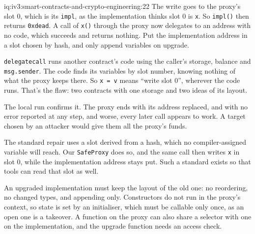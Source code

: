 \begin{solution}{iq:iv3:smart-contracts-and-crypto-engineering:22}
The write goes to the proxy's slot 0, which is its \texttt{impl}, as the implementation thinks slot 0 is \texttt{x}. So \texttt{impl()} then returns \texttt{0xdead}. A call of \texttt{x()} through the proxy now delegates to an address with no code, which succeeds and returns nothing. Put the implementation address in a slot chosen by hash, and only append variables on upgrade.

\texttt{delegatecall} runs another contract's code using the caller's storage, balance and \texttt{msg.sender}. The code finds its variables by slot number, knowing nothing of what the proxy keeps there. So \texttt{x = v} means ``write slot 0'', wherever the code runs. That's the flaw: two contracts with one storage and two ideas of its layout.

The local run confirms it. The proxy ends with its address replaced, and with no error reported at any step, and worse, every later call appears to work. A target chosen by an attacker would give them all the proxy's funds.

The standard repair uses a slot derived from a hash, which no compiler-assigned variable will reach. Our \texttt{SafeProxy} does so, and the same call then writes \texttt{x} in slot 0, while the implementation address stays put. Such a standard exists so that tools can read that slot as well.

An upgraded implementation must keep the layout of the old one: no reordering, no changed types, and appending only. Constructors do not run in the proxy's context, so state is set by an initialiser, which must be callable only once, as an open one is a takeover. A function on the proxy can also share a selector with one on the implementation, and the upgrade function needs an access check.

\end{solution}

